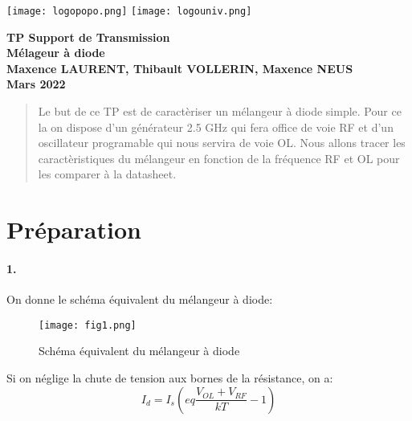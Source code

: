 \documentclass[oneside,a4paper,12pt]{article}
\begin{document}
	\begin{titlepage}
		\texttt{[image: logopopo.png]}
		\hspace*{\fill}
		\texttt{[image: logouniv.png]}
		
		\begin{center}
			\vspace{1cm}
			\textbf{TP Support de Transmission}\\
			\textbf{Mélageur à diode}\\
			\vspace{1cm}
			\textbf{Maxence LAURENT, Thibault VOLLERIN, Maxence NEUS}\\
			\vspace{3cm}
			\vspace{\fill}
			\textbf{Mars 2022}\\
		\end{center}
	\end{titlepage}
	
	\tableofcontents
	
	\vspace{5cm}
	
	\begin{abstract}
	Le but de ce TP est de caractèriser un mélangeur à diode simple. Pour ce la on dispose d'un générateur
	2.5 GHz qui fera office de voie RF et d'un oscillateur programable qui nous servira de voie OL.
	Nous allons tracer les caractèristiques du mélangeur en fonction de la fréquence RF et OL pour les comparer à la datasheet.
 	\end{abstract}

	\newpage

	\section{Préparation}
	
	\paragraph{1.}
	 On donne le schéma équivalent du mélangeur à diode:
	 \begin{figure}[h]
		 \centering
		 \texttt{[image: fig1.png]}
		 \caption{Schéma équivalent du mélangeur à diode}
	 \end{figure}

	Si on néglige la chute de tension aux bornes de la résistance, on a:
	\[ I_{d}=I_{s}(e{q\frac{V_{OL}+V_{RF}}{kT}} -1) \]
\end{document}
